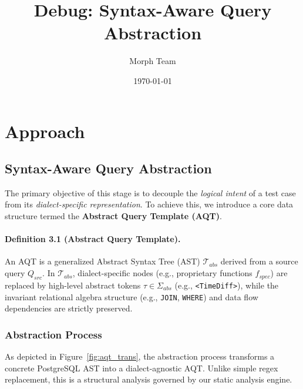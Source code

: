 \documentclass[a4paper,11pt]{article}
\title{Debug: Syntax-Aware Query Abstraction}
\author{Morph Team}
\date{\today}
\begin{document}
\maketitle

\section{Approach}

\subsection{Syntax-Aware Query Abstraction}
\label{sec:abstraction}

The primary objective of this stage is to decouple the \textit{logical intent} of a test case from its \textit{dialect-specific representation}. To achieve this, we introduce a core data structure termed the \textbf{Abstract Query Template (AQT)}.

\paragraph{Definition 3.1 (Abstract Query Template).} An AQT is a generalized Abstract Syntax Tree (AST) $\mathcal{T}_{abs}$ derived from a source query $Q_{src}$. In $\mathcal{T}_{abs}$, dialect-specific nodes (e.g., proprietary functions $f_{spec}$) are replaced by high-level abstract tokens $\tau \in \Sigma_{abs}$ (e.g., \texttt{<TimeDiff>}), while the invariant relational algebra structure (e.g., \texttt{JOIN}, \texttt{WHERE}) and data flow dependencies are strictly preserved.

\subsubsection{Abstraction Process}
As depicted in Figure~\ref{fig:aqt_trans}, the abstraction process transforms a concrete PostgreSQL AST into a dialect-agnostic AQT. Unlike simple regex replacement, this is a structural analysis governed by our static analysis engine.
\end{document}
